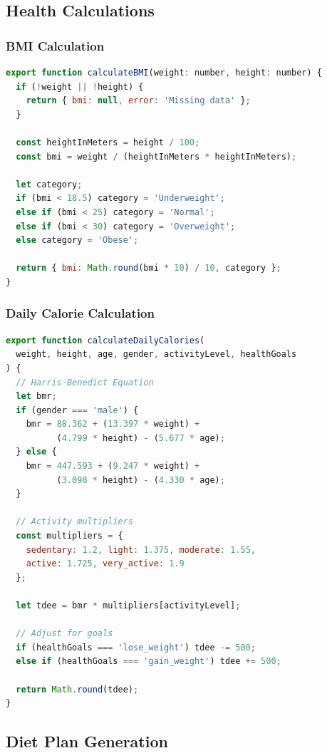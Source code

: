 \subsection{Health Calculations}

\subsubsection{BMI Calculation}

\begin{lstlisting}[language=JavaScript, caption=BMI Calculator]
export function calculateBMI(weight: number, height: number) {
  if (!weight || !height) {
    return { bmi: null, error: 'Missing data' };
  }
  
  const heightInMeters = height / 100;
  const bmi = weight / (heightInMeters * heightInMeters);
  
  let category;
  if (bmi < 18.5) category = 'Underweight';
  else if (bmi < 25) category = 'Normal';
  else if (bmi < 30) category = 'Overweight';
  else category = 'Obese';
  
  return { bmi: Math.round(bmi * 10) / 10, category };
}
\end{lstlisting}

\subsubsection{Daily Calorie Calculation}

\begin{lstlisting}[language=JavaScript, caption=Calorie Calculator]
export function calculateDailyCalories(
  weight, height, age, gender, activityLevel, healthGoals
) {
  // Harris-Benedict Equation
  let bmr;
  if (gender === 'male') {
    bmr = 88.362 + (13.397 * weight) + 
          (4.799 * height) - (5.677 * age);
  } else {
    bmr = 447.593 + (9.247 * weight) + 
          (3.098 * height) - (4.330 * age);
  }
  
  // Activity multipliers
  const multipliers = {
    sedentary: 1.2, light: 1.375, moderate: 1.55,
    active: 1.725, very_active: 1.9
  };
  
  let tdee = bmr * multipliers[activityLevel];
  
  // Adjust for goals
  if (healthGoals === 'lose_weight') tdee -= 500;
  else if (healthGoals === 'gain_weight') tdee += 500;
  
  return Math.round(tdee);
}
\end{lstlisting}

\subsection{Diet Plan Generation}

